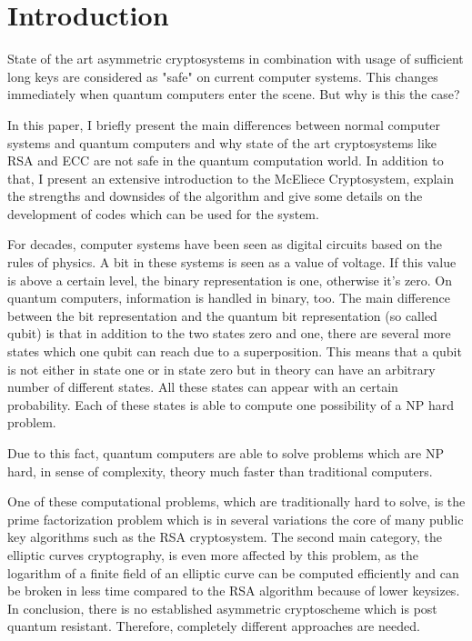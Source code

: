 \label{key}\section{Introduction}
State of the art asymmetric cryptosystems in combination with usage of sufficient long keys are considered as "safe" on current computer systems. This changes immediately when quantum computers enter the scene. But why is this the case? 

In this paper, I briefly present the main differences between normal computer systems and quantum computers and why state of the art cryptosystems like RSA and ECC are not safe in the quantum computation world. In addition to that, I present an extensive introduction to the McEliece Cryptosystem, explain the strengths and downsides of the algorithm and give some details on the development of codes which can be used for the system.

\label{conv_comp_vs_quan_comp}
For decades, computer systems have been seen as digital circuits based on the rules of physics. A bit in these systems is seen as a value of voltage. If this value is above a certain level, the binary representation is one, otherwise it's zero. 
On quantum computers, information is handled in binary, too. The main difference between the bit representation and the quantum bit representation (so called qubit) is that in addition to the two states zero and one, there are several more states which one qubit can reach due to a superposition. This means that a qubit is not either in state one or in state zero but in theory can have an arbitrary number of different states. All these states can appear with an certain probability. Each of these states is able to compute one possibility of a NP hard problem. 

Due to this fact, quantum computers are able to solve problems which are NP hard, in sense of complexity, theory much faster than traditional computers. 

One of these computational problems, which are traditionally hard to solve, is the prime factorization problem which is in several variations the core of many public key algorithms such as the RSA cryptosystem. 
The second main category, the elliptic curves cryptography, is even more affected by this problem, as the logarithm of a finite field of an elliptic curve can be computed efficiently and can be broken in less time compared to the RSA algorithm  because of lower keysizes. 
In conclusion, there is no established asymmetric cryptoscheme which is post quantum resistant. Therefore, completely different approaches are needed. 


